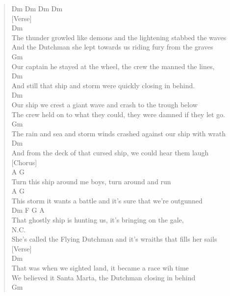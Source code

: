 \documentclass[11pt]{article}
\begin{document}
\begin{verse}
\vspace*{1em}
Dm Dm Dm Dm\\
\vspace*{1em}
[Verse]\\
Dm\\
The thunder growled like demons and the lightening stabbed the waves\\
And the Dutchman she lept towards us riding fury from the graves\\
Gm\\
Our captain he stayed at the wheel, the crew the manned the lines,\\
Dm\\
And still that ship and storm were quickly closing in behind.\\
\vspace*{1em}
Dm\\
Our ship we crest a giant wave and crash to the trough below\\
The crew held on to what they could, they were damned if they let go.\\
Gm\\
The rain and sea and storm winds crashed against our ship with wrath\\
Dm\\
And from the deck of that cursed ship, we could hear them laugh\\
\vspace*{1em}
[Chorus]\\
A                              G\\
Turn this ship around me boys, turn around and run\\
A                                     G\\
This storm it wants a battle and it's sure that we're outgunned\\
Dm                    F                G               A\\
That ghostly ship is hunting us, it's bringing on the gale,\\
N.C.\\
She's called the Flying Dutchman and it's wraiths that fills her sails\\
\vspace*{1em}
[Verse]\\
Dm\\
That was when we sighted land, it became a race wih time\\
We believed it Santa Marta, the Dutchman closing in behind\\
Gm\\

\end{verse}
\end{document}

